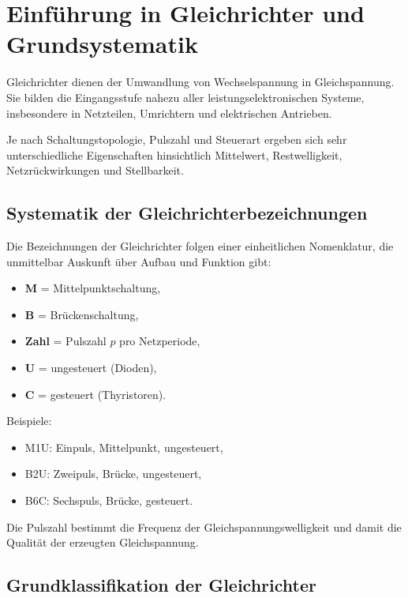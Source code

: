 \section{Einführung in Gleichrichter und Grundsystematik}

Gleichrichter dienen der Umwandlung von Wechselspannung in Gleichspannung.
Sie bilden die Eingangsstufe nahezu aller leistungselektronischen Systeme,
insbesondere in Netzteilen, Umrichtern und elektrischen Antrieben.

Je nach Schaltungstopologie, Pulszahl und Steuerart ergeben sich sehr unterschiedliche
Eigenschaften hinsichtlich Mittelwert, Restwelligkeit, Netzrückwirkungen und Stellbarkeit.

\subsection{Systematik der Gleichrichterbezeichnungen}

Die Bezeichnungen der Gleichrichter folgen einer einheitlichen Nomenklatur,
die unmittelbar Auskunft über Aufbau und Funktion gibt:

\begin{itemize}
\item \textbf{M} = Mittelpunktschaltung,
\item \textbf{B} = Brückenschaltung,
\item \textbf{Zahl} = Pulszahl $p$ pro Netzperiode,
\item \textbf{U} = ungesteuert (Dioden),
\item \textbf{C} = gesteuert (Thyristoren).
\end{itemize}

Beispiele:
\begin{itemize}
\item M1U: Einpuls, Mittelpunkt, ungesteuert,
\item B2U: Zweipuls, Brücke, ungesteuert,
\item B6C: Sechspuls, Brücke, gesteuert.
\end{itemize}

Die Pulszahl bestimmt die Frequenz der Gleichspannungswelligkeit
und damit die Qualität der erzeugten Gleichspannung.


\subsection{Grundklassifikation der Gleichrichter}

